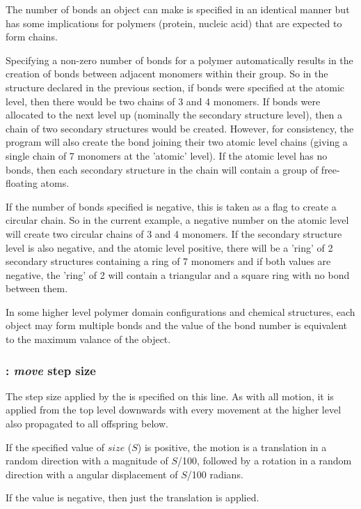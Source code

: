 The number of bonds an object can make is specified in an identical manner but has some
implications for polymers (protein, nucleic acid) that are expected to form chains.

Specifying a non-zero number of bonds for a polymer automatically results in the creation
of bonds between adjacent monomers within their group. 
So in the  structure declared in the previous section, if bonds
were specified at the atomic level, then there would be two chains of 3 and 4 monomers.
If bonds were allocated to the next level up (nominally the secondary structure level), then
a chain of two secondary structures would be created.  However, for consistency, the
program will also create the bond joining their two atomic level chains (giving a single
chain of 7 monomers at the 'atomic' level).  If the atomic level has no bonds, then each
secondary structure in the chain will contain a group of free-floating atoms.

If the number of bonds specified is negative, this is taken as a flag to create a circular
chain.  So in the current example, a negative number on the atomic level will create two
circular chains of 3 and 4 monomers.   If the secondary structure level is also negative,
and the atomic level positive, there will be a 'ring' of 2 secondary structures containing 
a ring of 7 monomers and if both values are negative, the 'ring' of 2 will contain a
triangular and a square ring with no bond between them.

In some higher level polymer domain configurations and chemical structures, each object
may form multiple bonds and the value of the bond number is equivalent to the maximum
valance of the object.  

\subsubsection{: {\em move} step size}

The step size applied by the  is specified on this line.   As with all motion,
it is applied from the top level downwards with every movement at the higher level also
propagated to all offspring below.

If the specified value of $size$ ($S$) is positive, the motion is a translation in a random direction
with a magnitude of $S$/100, followed by a rotation in a random direction with a angular
displacement of $S$/100 radians.

If the value is negative, then just the translation is applied.

